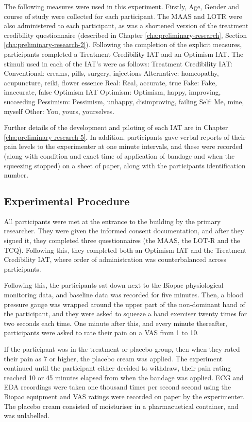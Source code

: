 The following measures were used in this experiment. Firstly, Age, Gender and course of study were collected for each participant. The MAAS and LOTR were also administered to each participant, as was a shortened version of the treatment credibility questionnaire (described in Chapter \ref{cha:preliminary-research}, Section \ref{cha:preliminary-research-2}). Following the completion of the explicit measures, participants completed a Treatment Credibility IAT and an Optimism IAT. The stimuli used in each of the IAT's were as follows:
\textup{Treatment Credibility IAT:}
Conventional: creams, pills, surgery, injections
Alternative: homeopathy, acupuncture, reiki, flower essence
Real: Real, accurate, true
Fake: Fake, inaccurate, false
Optimism IAT
Optimism: Optimism, happy, improving, succeeding
Pessimism: Pessimism, unhappy, disimproving, failing
Self: Me, mine, myself
Other: You, yours, yourselves. 

Further details of the development and piloting of each IAT are in Chapter \ref{cha:preliminary-research-5}. 
In addition, participants gave verbal reports of their pain levels to the experimenter at one minute intervals, and these were recorded (along with condition and exact time of application of bandage and when the squeezing stopped) on a sheet of paper, along with the participants identification number. 


\subsection{Experimental Procedure}

All participants were met at the entrance to the building by the primary researcher. They were given the informed consent documentation, and after they signed it, they completed three questionnaires (the MAAS, the LOT-R and the TCQ). Following this, they completed both an Optimism IAT and the Treatment Credibility IAT, where order of administration was counterbalanced across participants.

Following this, the participants sat down next to the Biopac physiological monitoring data, and baseline data was recorded for five minutes.  Then, a blood pressure gauge was wrapped around the upper part of the non-dominant hand of the participant, and they were asked to squeeze a hand exerciser twenty times for two seconds each time. One minute after this, and every minute thereafter, participants were asked to rate their pain on a VAS from 1 to 10.

If the participant was in the treatment or placebo group, then when they rated their pain as 7 or higher, the placebo cream was applied. The experiment continued until the participant either decided to withdraw, their pain rating reached 10 or 45 minutes elapsed  from when the bandage was applied. ECG and EDA recordings were taken one thousand times per second second using the Biopac equipment and VAS ratings were recorded on paper by the experimenter. The placebo cream consisted of moisturiser in a pharmacuetical container, and was unlabelled.

